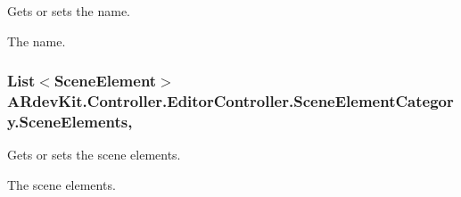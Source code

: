 Gets or sets the name. 

The name. \hypertarget{class_a_rdev_kit_1_1_controller_1_1_editor_controller_1_1_scene_element_category_a6e7b2d628b8ea21c13b6f4533a26c7ba}{
\subsubsection[{Scene\-Elements}]{\setlength{\rightskip}{0pt plus 5cm}List$<${\bf Scene\-Element}$>$ A\-Rdev\-Kit.\-Controller.\-Editor\-Controller.\-Scene\-Element\-Category.\-Scene\-Elements\hspace{0.3cm}{\ttfamily [get]}, {\ttfamily [set]}}}\label{class_a_rdev_kit_1_1_controller_1_1_editor_controller_1_1_scene_element_category_a6e7b2d628b8ea21c13b6f4533a26c7ba}


Gets or sets the scene elements. 

The scene elements. 